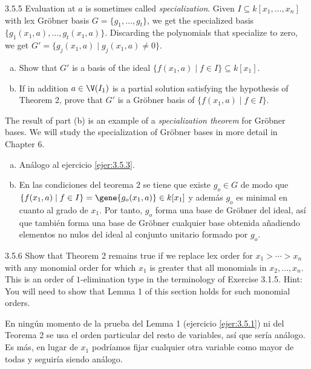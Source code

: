 \documentclass[twoside]{article}
\begin{document}
\newpage

\begin{ejercicio}{3.5.5}
Evaluation at $a$ is sometimes called \emph{specialization}.
Given $I \subseteq k[x_1,\dots,x_n]$ with lex Gröbner basis $G = \{g_1,\dots,g_t\}$, we get the specialized basis $\{g_1(x_1,a),\dots,g_t(x_1,a)\}$.
Discarding the polynomials that specialize to zero, we get $G' = \{g_j(x_1,a) \mid g_j(x_1,a) \neq 0\}$.
\begin{enumerate}[a.]
\item Show that $G'$ is a basis of the ideal $\{f(x_1,a) \mid f \in I\} \subseteq k[x_1]$.
\item If in addition $a \in \V(I_1)$ is a partial solution satisfying the hypothesis of Theorem 2, prove that $G'$ is a Gröbner basis of $\{f(x_1,a) \mid f \in I\}$.
\end{enumerate}
The result of part (b) is an example of a \emph{specialization theorem} for Gröbner bases.
We will study the specialization of Gröbner bases in more detail in Chapter 6.
\end{ejercicio}
\begin{solucion}
\begin{enumerate}[a.]
\item Análogo al ejercicio \ref{ejer:3.5.3}.
\item En las condiciones del teorema 2 se tiene que existe $g_o\in G$ de modo que $\{f(x_1,a) \mid f \in I\}=\gene{g_o(x_1,a)}\in k[x_1]$ y además $g_o$ es minimal en cuanto al grado de $x_1$. Por tanto, $g_o$ forma una base de Gröbner del ideal, así que también forma una base de Gröbner cualquier base obtenida añadiendo elementos no nulos del ideal al conjunto unitario formado por $g_o$. 
\end{enumerate}
\end{solucion}
\newpage

\begin{ejercicio}{3.5.6}
Show that Theorem 2 remains true if we replace lex order for $x_1 > \cdots > x_n$ with any monomial order for which $x_1$ is greater that all monomials in $x_2,\dots,x_n$.
This is an order of $1$-elimination type in the terminology of Exercise 3.1.5.
Hint: You will need to show that Lemma 1 of this section holds for such monomial orders.
\end{ejercicio}
\begin{solucion}
En ningún momento de la prueba del Lemma 1 (ejercicio \ref{ejer:3.5.1}) ni del Teorema 2 se usa el orden particular del resto de variables, así que sería análogo. Es más, en lugar de $x_1$ podríamos fijar cualquier otra variable como mayor de todas y seguiría siendo análogo.
\end{solucion}
\newpage
\end{document}
